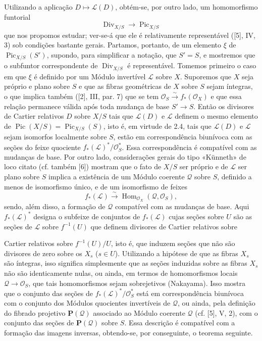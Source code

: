 \documentclass[11pt,twoside,openany]{book}
\numberwithin{equation}{section}
\newcommand{\src}[1]{%
  \phantomsection\hypertarget{src:#1}{}%
  \marginpar{\raggedleft\footnotesize\sffamily #1}%
}
\theoremstyle{plain}
\theoremstyle{definition}
\theoremstyle{remark}
\newcommand{\FgaUnitKey}{frontmatter}
\renewcommand{\src}[1]{%
  \phantomsection\hypertarget{src:\FgaUnitKey:#1}{}%
  \marginpar{\raggedleft\footnotesize\sffamily #1}%
}
\begin{document}
Utilizando a aplicação $D\longmapsto\mathcal L(D)$, obtém-se, por outro lado,
um homomorfismo funtorial
\begin{equation}
\operatorname{Div}_{X/S}\longrightarrow\operatorname{Pic}_{X/S}
\tag{+}
\end{equation}
que nos propomos estudar; ver-se-á que ele é relativamente representável ([5],
IV, 3) sob condições bastante gerais. Partamos, portanto, de um elemento $\xi$
de $\operatorname{Pic}_{X/S}(S')$, supondo, para simplificar a notação, que
$S'=S$, e mostremos que o subfuntor correspondente de
$\operatorname{Div}_{X/S}$ é representável. Tomemos primeiro o caso em que
$\xi$ é definido por um Módulo invertível $\mathcal L$ sobre $X$. Suporemos
que $X$ seja próprio e plano sobre $S$ e que as fibras geométricas de $X$
sobre $S$ sejam íntegras, o que implica também ([2], III, par. 7) que se tem
$\mathcal O_S\xrightarrow{\sim}f_*(\mathcal O_X)$ e que essa relação permanece
válida após toda mudança de base $S'\longrightarrow S$. Então os divisores de
Cartier relativos $D$ sobre $X/S$ tais que $\mathcal L(D)$ e $\mathcal L$
definem o mesmo elemento de
$\operatorname{Pic}(X/S)=\operatorname{Pic}_{X/S}(S)$, isto é, em virtude de
2.4, tais que $\mathcal L(D)$ e $\mathcal L$ sejam isomorfos localmente sobre
$S$, estão em correspondência biunívoca com as seções do feixe quociente
$f_*(\mathcal L)^*/\mathcal O_S^*$. Essa correspondência é compatível com as
mudanças de base. Por outro lado, considerações gerais do tipo «Künneth» de
loco citato (cf. também [6]) mostram que o fato de $X/S$ ser próprio e de
$\mathcal L$ ser plano sobre $S$ implica a existência de um Módulo coerente
$\mathcal Q$ sobre $S$, definido a menos de isomorfismo único, e de um
isomorfismo de feixes
\[
f_*(\mathcal L)\xrightarrow{\sim}
\operatorname{Hom}_{\mathcal O_X}(\mathcal Q,\mathcal O_S),
\]
 sendo, além disso, a formação de $\mathcal Q$
compatível com as mudanças de base. Aqui $f_*(\mathcal L)^*$ designa o
subfeixe de conjuntos de $f_*(\mathcal L)$ cujas seções sobre $U$ são as
seções de $\mathcal L$ sobre $f^{-1}(U)$ que definem divisores de Cartier
relativos sobre
\src{153}
Cartier relativos sobre $f^{-1}(U)/U$, isto é, que induzem seções que não são
divisores de zero sobre os $X_s$ ($s\in U$). Utilizando a hipótese de que as
fibras $X_s$ são íntegras, isso significa simplesmente que as seções induzidas
sobre as fibras $X_s$ não são identicamente nulas, ou ainda, em termos de
homomorfismos locais $\mathcal Q\longrightarrow\mathcal O_S$, que tais
homomorfismos sejam sobrejetivos (Nakayama). Isso mostra que o conjunto das
seções de $f_*(\mathcal L)^*/\mathcal O_S^*$ está em correspondência biunívoca
com o conjunto dos Módulos quocientes invertíveis de $\mathcal Q$, ou ainda,
pela definição do fibrado projetivo $\mathbf P(\mathcal Q)$ associado ao Módulo
coerente $\mathcal Q$ (cf. [5], V, 2), com o conjunto das seções de
$\mathbf P(\mathcal Q)$ sobre $S$. Essa descrição é compatível com a formação
das imagens inversas, obtendo-se, por conseguinte, o teorema seguinte.
\end{document}
